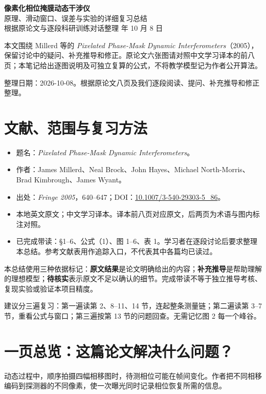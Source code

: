 \documentclass[UTF8,fontset=fandol,11pt,a4paper]{ctexart}
\begin{document}
\begin{center}
{\LARGE\bfseries\color{ink} 像素化相位掩膜动态干涉仪}\\[7pt]
{\Large 原理、滑动窗口、误差与实验的详细复习总结}\\[9pt]
{\small 根据原论文与逐段科研训练对话整理 年 10 月 8 日}
\end{center}
\noindent 本文围绕 Millerd 等的 \textit{Pixelated Phase-Mask Dynamic Interferometers}（2005），保留讨论中的疑问、补充推导和修正。原论文六张图请对照中文学习译本的前八页；本笔记给出逐图说明及可独立复算的公式，不将教学模型记为作者公开算法。
\tableofcontents
\clearpage


整理日期：2026-10-08。根据原论文八页及我们逐段阅读、提问、补充推导和修正整理。

\section{文献、范围与复习方法}

\begin{itemize}
\item 题名：\emph{Pixelated Phase-Mask Dynamic Interferometers}。
\item 作者：James Millerd、Neal Brock、John Hayes、Michael North-Morris、Brad Kimbrough、James Wyant。
\item 出处：\emph{Fringe 2005}，640–647；DOI：\href{https://doi.org/10.1007/3-540-29303-5_86}{10.1007/3-540-29303-5\_86}。
\item 本地英文原文；中文学习译本。译本前八页对应原文，后两页为术语与图内标注对照。
\item 已完成带读：§1–6、公式（1）、图 1–6、表 1。学习者在逐段讨论后要求整理本总结。参考文献表用作追踪入口，不代表其中各篇均已读过。

\end{itemize}
本总结使用三种依据标记：\textbf{原文结果}是论文明确给出的内容；\textbf{补充推导}是帮助理解的理想模型；\textbf{待核实}表示原文不足以确认的细节。完成带读不等于独立推导考核、复现实验或验证本项目精度。

建议分三遍复习：第一遍读第 2、8–11、14 节，连起整条测量链；第二遍读第 3–7 节，重看公式与窗口；第三遍按第 13 节的问题回查。无需记忆图 2 每一个峰谷。

\section{一页总览：这篇论文解决什么问题？}

动态过程中，顺序拍摄四幅相移图时，待测相位可能在帧间变化。作者把不同相移编码到探测器的不同像素，使一次曝光同时记录相位恢复所需的信息。
\end{document}
